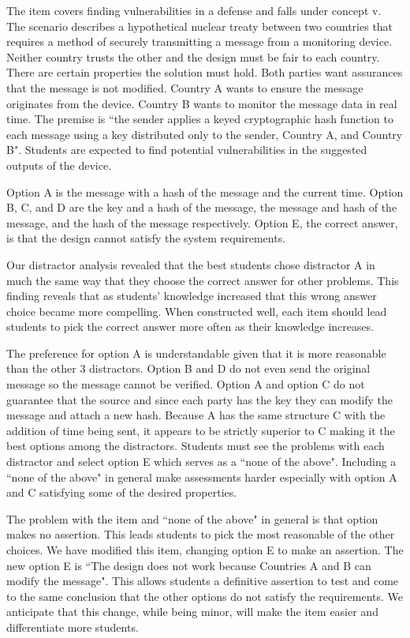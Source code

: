 The item covers finding vulnerabilities in a defense and falls under concept \gls{v}. The scenario describes a hypothetical nuclear treaty between two countries that requires a method of securely transmitting a message from a monitoring device. Neither country trusts the other and the design must be fair to each country. There are certain properties the solution must hold. Both parties want assurances that the message is not modified. Country A wants to ensure the message originates from the device. Country B wants to monitor the message data in real time. The premise is ``the sender applies a keyed cryptographic hash function to each message using a key distributed only to the sender, Country A, and Country B". Students are expected to find potential vulnerabilities in the suggested outputs of the device.

Option A is the message with a hash of the message and the current time. Option B, C, and D are the key and a hash of the message, the message and hash of the message, and the hash of the message respectively. Option E, the correct answer, is that the design cannot satisfy the system requirements. 

Our distractor analysis revealed that the best students chose distractor A  in much the same way that they choose the correct answer for other problems. This finding reveals that as students' knowledge increased that this wrong answer choice became more compelling. When constructed well, each item should lead students to pick the correct answer more often as their knowledge increases.

The preference for option A is understandable given that it is more reasonable than the other 3 distractors. Option B and D do not even send the original message so the message cannot be verified. Option A and option C do not guarantee that the source and since each party has the key they can modify the message and attach a new hash. Because A has the same structure C with the addition of time being sent, it appears to be strictly superior to C making it the best options among the distractors. Students must see the problems with each distractor and select option E which serves as a ``none of the above". Including a ``none of the above" in general make assessments harder \cite{none_of_above} especially with option A and C satisfying some of the desired properties. 

The problem with the item and ``none of the above" in general is that option makes no assertion. This leads students to pick the most reasonable of the other choices. We have modified this item, changing option E to make an assertion. The new option E is ``The design does not work because Countries A and B can modify the message". This allows students a definitive assertion to test and come to the same conclusion that the other options do not satisfy the requirements. We anticipate that this change, while being minor, will make the item easier and differentiate more students.

